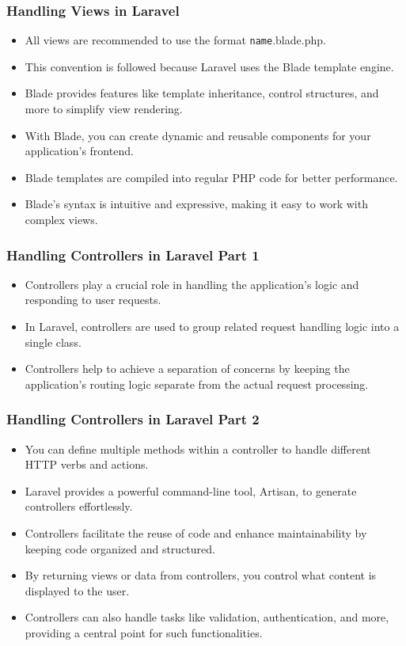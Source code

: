 \documentclass[aspectratio=169, table]{beamer}
\begin{document}
\begin{frame}[fragile]
    \frametitle{Handling Views in Laravel}
    \begin{itemize}
        \item All views are recommended to use the format \texttt{{name}}.blade.php.
        \item This convention is followed because Laravel uses the Blade template engine.
        \item Blade provides features like template inheritance, control structures, and more to simplify view rendering.
        \item With Blade, you can create dynamic and reusable components for your application's frontend.
        \item Blade templates are compiled into regular PHP code for better performance.
        \item Blade's syntax is intuitive and expressive, making it easy to work with complex views.
    \end{itemize}
\end{frame}

\begin{frame}[fragile]
    \frametitle{Handling Controllers in Laravel Part 1}
    \begin{itemize}
        \item Controllers play a crucial role in handling the application's logic and responding to user requests.
        \item In Laravel, controllers are used to group related request handling logic into a single class.
        \item Controllers help to achieve a separation of concerns by keeping the application's routing logic separate from the actual request processing.
    \end{itemize}
\end{frame}

\begin{frame}[fragile]
    \frametitle{Handling Controllers in Laravel Part 2}
    \begin{itemize}
        \item You can define multiple methods within a controller to handle different HTTP verbs and actions.
        \item Laravel provides a powerful command-line tool, Artisan, to generate controllers effortlessly.
        \item Controllers facilitate the reuse of code and enhance maintainability by keeping code organized and structured.
        \item By returning views or data from controllers, you control what content is displayed to the user.
        \item Controllers can also handle tasks like validation, authentication, and more, providing a central point for such functionalities.
    \end{itemize}
\end{frame}
\end{document}
